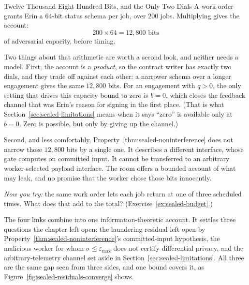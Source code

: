 \documentclass[11pt,a4paper]{article}
\theoremstyle{definition}
\begin{document}
\begin{pdexample}{Twelve Thousand Eight Hundred Bits, and the Only Two Dials}
\setlength{\parskip}{4pt plus 1pt}
A work order grants Erin a $64$-bit status schema per job, over $200$ jobs.
Multiplying gives the account:
\[
200\times 64=12{,}800\text{ bits}
\]
of adversarial capacity, before timing.

Two things about that arithmetic are worth a second
look, and neither needs a model. First, the account is a \emph{product}, so
the contract writer has exactly two dials, and they trade off against each
other: a narrower schema over a longer engagement gives the same $12{,}800$
bits. For an engagement with $q>0$, the only setting that drives this capacity bound to zero is $b=0$,
which closes the feedback channel that was Erin's reason for signing in the
first place. (That is what Section~\ref{sec:sealed-limitations} means when it
says ``zero'' is available only at $b=0$. Zero is possible, but only by giving
up the channel.)

Second, and less comfortably,
Property~\ref{thm:sealed-noninterference} does not narrow those $12{,}800$ bits
by a single one. It describes a different interface, whose gate computes on committed input.
It cannot be transferred to an arbitrary worker-selected payload interface. The
room offers a bounded account of what may leak, and no promise that the
worker chose those bits innocently.

\emph{Now you try:}
the same work order lets each job return at one of three scheduled times.
What does that add to the total? (Exercise~\ref{ex:sealed-budget}.)
\end{pdexample}

The four links combine into one information-theoretic account. It settles
three questions the chapter left open: the laundering residual left open by
Property~\ref{thm:sealed-noninterference}'s committed-input hypothesis, the
malicious worker for whom $\sigma\le\varepsilon_{\max}$ does not certify differential privacy,
and the arbitrary-telemetry channel set aside in
Section~\ref{sec:sealed-limitations}. All three are the same gap seen from
three sides, and one bound covers it, as
Figure~\ref{fig:sealed-residuals-converge} shows.


\FloatBarrier
\end{document}
